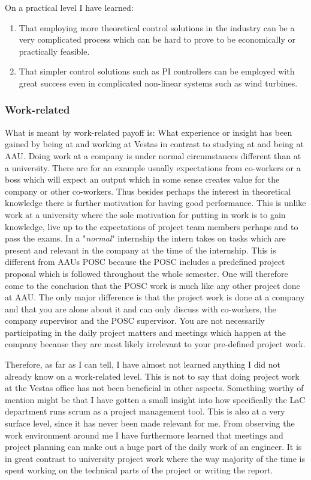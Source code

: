 On a practical level I have learned:
\begin{enumerate}
	\item That employing more theoretical control solutions in the industry can be a very complicated process which can be hard to prove to be economically or practically feasible. 
	\item That simpler control solutions such as PI controllers can be employed with great success even in complicated non-linear systems such as wind turbines.
\end{enumerate}

\subsubsection{Work-related}
What is meant by work-related payoff is: What experience or insight has been gained by being at and working at Vestas in contrast to studying at and being at AAU. Doing work at a company is under normal circumstances different than at a university. There are for an example usually expectations from co-workers or a boss which will expect an output which in some sense creates value for the company or other co-workers. Thus besides perhaps the interest in theoretical knowledge there is further motivation for having good performance. This is unlike work at a university where the sole motivation for putting in work is to gain knowledge, live up to the expectations of project team members perhaps and to pass the exams. In a "\textit{normal}" internship the intern takes on tasks which are present and relevant in the company at the time of the internship. This is different from AAUs POSC because the POSC includes a predefined project proposal which is followed throughout the whole semester. One will therefore come to the conclusion that the POSC work is much like any other project done at AAU. The only major difference is that the project work is done at a company and that you are alone about it and can only discuss with co-workers, the company supervisor and the POSC supervisor. You are not necessarily participating in the daily project matters and meetings which happen at the company because they are most likely irrelevant to your pre-defined project work.

Therefore, as far as I can tell, I have almost not learned anything I did not already know on a work-related level. This is not to say that doing project work at the Vestas office has not been beneficial in other aspects. Something worthy of mention might be that I have gotten a small insight into how specifically the LaC department runs scrum as a project management tool. This is also at a very surface level, since it has never been made relevant for me. From observing the work environment around me I have furthermore learned that meetings and project planning can make out a huge part of the daily work of an engineer. It is in great contrast to university project work where the way majority of the time is spent working on the technical parts of the project or writing the report.

